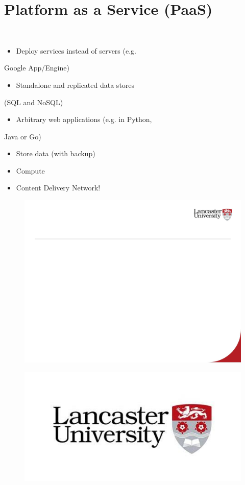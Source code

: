 \documentclass[12pt]{article}
\begin{document}
\section{Platform as a Service (PaaS)}
\\
\begin{itemize}
  \item Deploy services instead of servers (e.g. 
\end{itemize}
Google App/Engine)\\
\begin{itemize}
  \item Standalone and replicated data stores 
\end{itemize}
(SQL and NoSQL)\\
\begin{itemize}
  \item Arbitrary web applications (e.g. in Python, 
\end{itemize}
Java or Go)\\
\begin{itemize}
  \item Store data (with backup)
  \item Compute
  \item Content Delivery Network!
\end{itemize}
\begin{figure}[H]
\includegraphics[width=0.5\linewidth]{page87-image-1.png}
\end{figure}
\begin{figure}[H]
\includegraphics[width=0.5\linewidth]{page87-image-2.png}
\end{figure}
\end{document}
